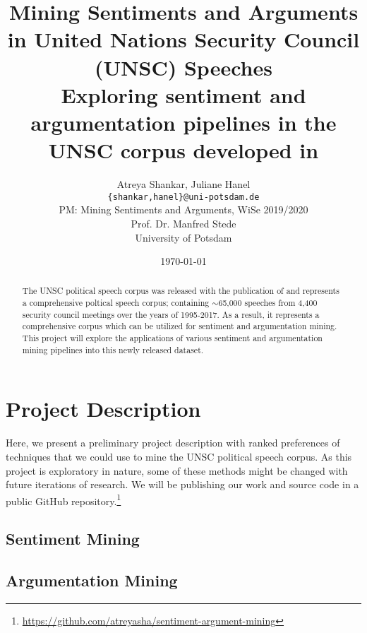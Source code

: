 \documentclass[12pt,a4paper]{article}
\title{Mining Sentiments and Arguments in United Nations Security Council (UNSC)
  Speeches \\[5pt]
\large Exploring sentiment and argumentation pipelines in the UNSC corpus
developed in \citet{schnfeld2019security}}
\author{Atreya Shankar, Juliane Hanel\\
\texttt{\{shankar,hanel\}@uni-potsdam.de} \\
PM: Mining Sentiments and Arguments, WiSe 2019/2020 \\
Prof. Dr. Manfred Stede \\
University of Potsdam}
\date{\today}
\begin{document}
\maketitle
\thispagestyle{empty}

\begin{abstract}\label{abstract}
  The UNSC political speech corpus was released with the publication of \citet{schnfeld2019security}
  and represents a comprehensive poltical speech corpus; containing $\sim$65,000
  speeches from 4,400 security council meetings over the years of 1995-2017. As a
  result, it represents a comprehensive corpus which can be utilized for
  sentiment and argumentation mining. This project will explore the applications
  of various sentiment and argumentation mining pipelines into this newly released dataset. 
  
\end{abstract}

\newpage
\setcounter{page}{1}
\thispagestyle{plain}

\section{Project Description}\label{sec:intro}

Here, we present a preliminary project description with ranked preferences of
techniques that we could use to mine the UNSC political speech corpus. As this
project is exploratory in nature, some of these methods might be changed with
future iterations of research. We will be publishing our work and source code in
a public GitHub repository.\footnote{\url{https://github.com/atreyasha/sentiment-argument-mining}}

\subsection{Sentiment Mining}

\subsection{Argumentation Mining}

\newpage


\nocite{*}
\end{document}
